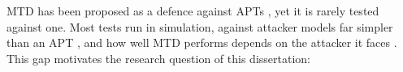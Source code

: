 \documentclass{cshonours}
\begin{document}
MTD has been proposed as a defence against APTs \citep{alshamrani2019},
yet it is rarely tested against one. Most tests run in simulation,
against attacker models far simpler than an APT
\citep{cho2020, jalowski2026}, and how well MTD performs depends on the
attacker it faces \citep{hong2018}.
This gap motivates the
research question of this dissertation:
\end{document}
